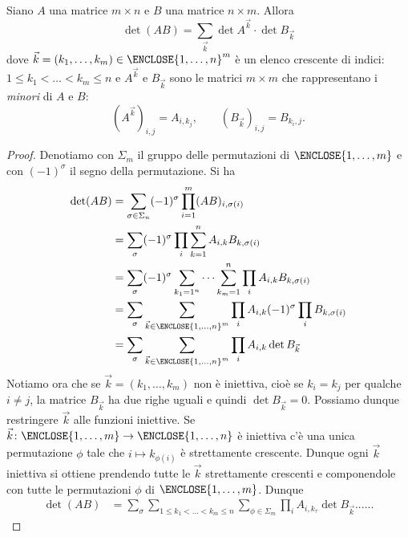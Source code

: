 \begin{theorem}
  Siano $A$ una matrice $m\times n$ e $B$ una matrice $n\times m$.
  Allora 
  \[
    \det (AB) = \sum_{\vec k} \det A^{\vec k}\cdot \det B_{\vec k}
  \]
  dove 
  $\vec k = (k_1,\dots,k_m) \in \ENCLOSE{1,\dots,n}^m$ 
  è un elenco crescente di indici: $1\le k_1 < \dots < k_m\le n$
  e $A^{\vec k}$ e $B_{\vec k}$ sono le matrici $m\times m$ che 
  rappresentano i \emph{minori} di $A$ e $B$:
  \[
    (A^{\vec k})_{i,j} = A_{i,k_j}, \qquad
    (B_{\vec k})_{i,j} = B_{k_i, j}.
  \]
\end{theorem}
\begin{proof}
Denotiamo con $\Sigma_m$ il gruppo delle permutazioni 
di $\ENCLOSE{1,\dots,m}$ 
e con $(-1)^\sigma$ il segno della permutazione.
Si ha
\begin{align*}
  \det (AB) &= \sum_{\sigma \in \Sigma_n} (-1)^\sigma \prod_{i=1}^m (AB)_{i,\sigma(i)} \\
    &= \sum_\sigma (-1)^\sigma \prod_i \sum_{k=1}^n A_{i,k} B_{k,\sigma(i)} \\
    &= \sum_\sigma (-1)^\sigma \sum_{k_1=1^n} \dots \sum_{k_m=1}^n \prod_i A_{i,k} B_{k,\sigma(i)} \\
    &= \sum_\sigma \sum_{\vec k\in \ENCLOSE{1,\dots,n}^m} \prod_i A_{i,k} (-1)^\sigma \prod_i B_{k,\sigma(i)} \\    
    &= \sum_\sigma \sum_{\vec k\in \ENCLOSE{1,\dots,n}^m} \prod_i A_{i,k} \det B_{\vec k}
\end{align*}
Notiamo ora che se $\vec k = (k_1,\dots,k_m)$ non è iniettiva, cioè se $k_i = k_j$ per qualche 
$i\neq j$, la matrice $B_{\vec k}$ ha due righe uguali e quindi $\det B_{\vec k}=0$. 
Possiamo dunque restringere $\vec k$ alle funzioni iniettive.
Se $\vec k\colon\ENCLOSE{1,\dots,m}\to\ENCLOSE{1,\dots,n}$ è iniettiva c'è una 
unica permutazione $\phi$ tale che $i\mapsto k_{\phi(i)}$ è strettamente crescente.
Dunque ogni $\vec k$ iniettiva si ottiene prendendo tutte le $\vec k$ strettamente crescenti 
e componendole con tutte le permutazioni $\phi$ di $\ENCLOSE{1,\dots,m}$. 
Dunque
\begin{align*}
  \det(AB) &= \sum_\sigma \sum_{1\le k_1<\dots<k_m\le n}\sum_{\phi\in \Sigma_m} 
    \prod_i A_{i,k_{\tau}} \det B_{\vec k} ......
\end{align*}
\end{proof}